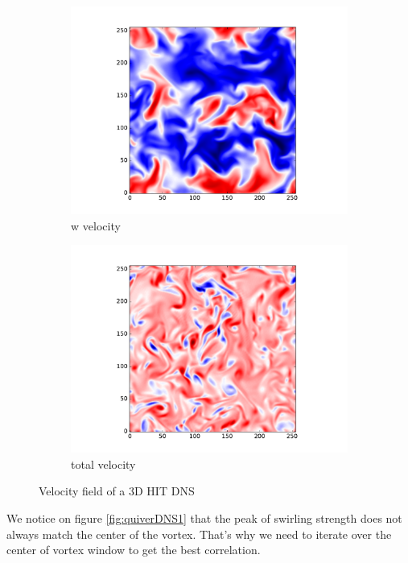 \documentclass[12pt, a4paper, openany]{memoir}
\begin{document}
\begin{figure}[h!]
\begin{subfigure}[b]{0.45\textwidth}
		\includegraphics[trim=80 20 80 20 ,clip,width=\textwidth]{figure/dns_w.pdf}
		\caption{w velocity}
	\end{subfigure}
	\begin{subfigure}[b]{0.45\textwidth}
		\centering
		\includegraphics[trim=80 20 80 20 ,clip,width=\textwidth]{figure/dns_total.pdf}
		\caption{total velocity}
	\end{subfigure}
	\caption{Velocity field of a 3D HIT DNS}
	\label{fig:velocity_field}
\end{figure}

We notice on figure \ref{fig:quiverDNS1} that the peak of swirling strength does not always match the center of the vortex. That's why we need to iterate over the center of vortex window to get the best correlation.
\end{document}
